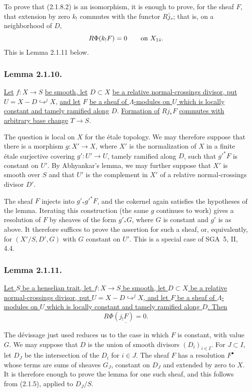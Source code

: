 To prove that (2.1.8.2) is an isomorphism, it is enough to prove, for
the sheaf $F$, that extension by zero $k_!$ commutes with the functor
$R\bar j_*$; that is, on a neighborhood of $D$,
\[
R\Phi(k_!F)=0\qquad\hbox{on }X_{1\bar s}.
\]
This is Lemma 2.1.11 below.

\subsubsection*{Lemma 2.1.10.}
\underline{Let} $f:X\longrightarrow S$ \underline{be smooth, let}
$D\subset X$ \underline{be a relative normal-crossings divisor, put}
$U=X-D\mathrel{\mathop{\hookrightarrow}^{j}}X$, \underline{and let}
$F$ \underline{be a sheaf of $\Lambda$-modules on $U$ which is locally
constant and tamely ramified along} $D$.  \underline{Formation of}
$Rj_*F$ \underline{commutes with arbitrary base change}
$T\longrightarrow S$.

The question is local on $X$ for the \'{e}tale topology.  We may
therefore suppose that there is a morphism $g:X'\longrightarrow X$,
where $X'$ is the normalization of $X$ in a finite \'{e}tale
surjective covering $g':U'\longrightarrow U$, tamely ramified along
$D$, such that $g'^*F$ is constant on $U'$.  By Abhyankar's lemma, we
may further suppose that $X'$ is smooth over $S$ and that $U'$ is the
complement in $X'$ of a relative normal-crossings divisor $D'$.

The sheaf $F$ injects into $g'_*g'^*F$, and the cokernel again
satisfies the hypotheses of the lemma.  Iterating this construction
(the same $g$ continues to work) gives a resolution of $F$ by sheaves
of the form $g'_*G$, where $G$ is constant and $g'$ is as above.  It
therefore suffices to prove the assertion for such a sheaf, or,
equivalently, for $(X'/S,D',G)$ with $G$ constant on $U'$.  This is a
special case of SGA~5, II, 4.4.

\subsubsection*{Lemma 2.1.11.}
\underline{Let $S$ be a henselian trait, let $f:X\longrightarrow S$
be smooth, let $D\subset X$ be a relative normal-crossings divisor,
put $U=X-D\mathrel{\mathop{\hookrightarrow}^{j}}X$, and let $F$ be a
sheaf of $\Lambda$-modules on $U$ which is locally constant and tamely
ramified along $D$.  Then}
\[
\underline{R\Phi(j_!F)=0.}
\]

The d\'{e}vissage just used reduces us to the case in which $F$ is
constant, with value $G$.  We may suppose that $D$ is the union of
smooth divisors $(D_i)_{i\in I}$.  For $J\subset I$, let $D_J$ be the
intersection of the $D_i$ for $i\in J$.  The sheaf $F$ has a
resolution $F^\bullet$ whose terms are sums of sheaves $G_J$, constant
on $D_J$ and extended by zero to $X$.  It is therefore enough to prove
the lemma for one such sheaf, and this follows from (2.1.5), applied to
$D_J/S$.

